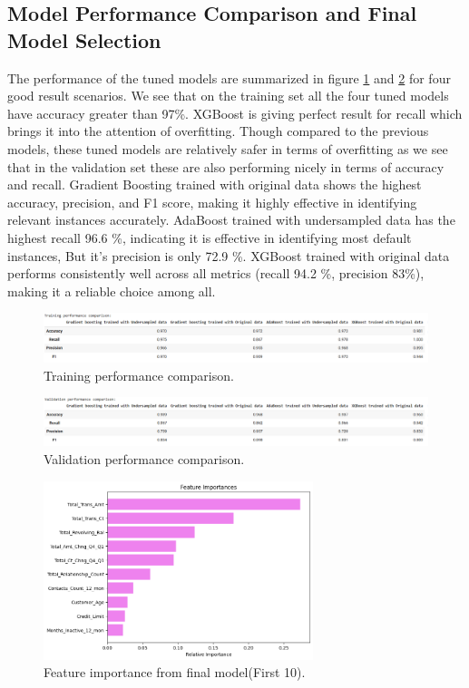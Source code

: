 \documentclass[10pt,a4paper]{style}
\begin{document}
\subsection{Model Performance Comparison and Final Model Selection}
	The performance of the tuned models are summarized in figure \ref*{fig:Training performance comparison} and \ref{fig:Validation performance comparison} for four good result scenarios. We see that on the training set all the four tuned models have accuracy greater than 97\%. XGBoost is giving perfect result for recall which brings it into the attention of overfitting. Though compared to the previous models, these tuned models are relatively safer in terms of overfitting as we see that in the validation set these are also performing nicely in terms of accuracy and recall. Gradient Boosting trained with original data shows the highest accuracy, precision, and F1 score, making it highly effective in identifying relevant instances accurately. AdaBoost trained with undersampled data has the highest recall 96.6 \%, indicating it is effective in identifying most default instances, But it's precision is only 72.9 \%. XGBoost trained with original data performs consistently well across all metrics (recall 94.2 \%, precision 83\%), making it a reliable choice among all. 
	\begin{figure}[h]
		\centering
		\includegraphics[width=\textwidth]{Training performance comparison.png}
		\caption{Training performance comparison.}
		\label{fig:Training performance comparison}
	\end{figure}
	\begin{figure}[h]
		\centering
		\includegraphics[width=\textwidth]{Validation performance comparison.png}
		\caption{Validation performance comparison.}
		\label{fig:Validation performance comparison}
	\end{figure}
	\begin{figure}[h]
		\centering
		\includegraphics[width=0.7\textwidth]{feature_importance.png}
		\caption{Feature importance from final model(First 10).}
		\label{fig:feature_importance}
	\end{figure}
\end{document}
